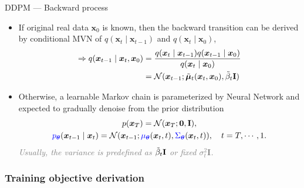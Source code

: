 \documentclass[10pt]{beamer}
\begin{document}
\begin{frame}{DDPM --- \normalsize Backward process}
    \begin{itemize}
        \item If original real data $\bm{x}_0$ is known, then the backward transition can be derived by conditional MVN of $q(\bm{x}_t\mid\bm{x}_{t-1})$ and $q(\bm{x}_t\mid\bm{x}_0)$,
        \begin{align*}
            \Rightarrow q(\bm{x}_{t-1}\mid\bm{x}_t,\bm{x}_0) & = \frac{q(\bm{x}_t\mid\bm{x}_{t-1})q(\bm{x}_{t-1}\mid\bm{x}_0)}{q(\bm{x}_t\mid\bm{x}_0)}  \\
            & = \mathcal{N}(\bm{x}_{t-1};\Tilde{\bm{\mu}}_t(\bm{x}_t,\bm{x}_0),\Tilde{\beta}_t\mathbf{I})
        \end{align*}

        \item Otherwise, a learnable Markov chain is parameterized by Neural Network and expected to gradually denoise from the prior distribution
        \begin{gather}
            p(\bm{x}_T)=\mathcal{N}(\bm{x}_T;\bm{0},\mathbf{I}), \notag\\
            \textcolor{blue}{p_{\bm{\theta}}}(\bm{x}_{t-1}\mid\bm{x}_{t})=\mathcal{N}(\bm{x}_{t-1};\textcolor{blue}{\mu_{\bm{\theta}}}(\bm{x}_t,t),\textcolor{blue}{{\Sigma}_{\bm{\theta}}}(\bm{x}_t,t)), \quad t=T,\cdots,1. \label{eq:learnableddpm}
        \end{gather}
        \textit{\textcolor{gray}{Usually, the variance is predefined as $\Tilde{\beta}_t\mathbf{I}$ or fixed $\sigma_t^2\mathbf{I}$.}}
    \end{itemize}
\end{frame}


\subsubsection{Training objective derivation}
\end{document}

